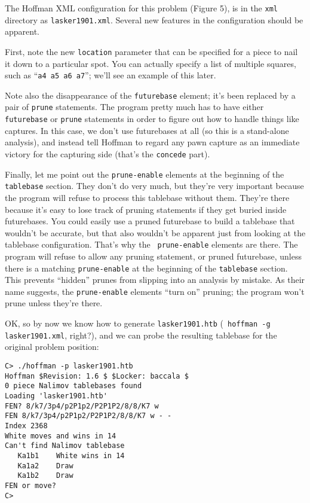 \documentclass[11pt]{article}
\begin{document}
The Hoffman XML configuration for this problem (Figure 5), is in the
{\tt xml} directory as {\tt lasker1901.xml}.  Several new
features in the configuration should be apparent.

First, note the new {\tt location} parameter that can be specified for
a piece to nail it down to a particular spot.  You can actually
specify a list of multiple squares, such as ``{\tt a4 a5 a6 a7}'';
we'll see an example of this later.

Note also the disappearance of the {\tt futurebase} element; it's been
replaced by a pair of {\tt prune} statements.  The program pretty much
has to have either {\tt futurebase} or {\tt prune} statements in order
to figure out how to handle things like captures.  In this case, we
don't use futurebases at all (so this is a stand-alone analysis), and
instead tell Hoffman to regard any pawn capture as an immediate
victory for the capturing side (that's the {\tt concede} part).

Finally, let me point out the {\tt prune-enable} elements at the
beginning of the {\tt tablebase} section.  They don't do very much,
but they're very important because the program will refuse to process
this tablebase without them.  They're there because it's easy to lose
track of pruning statements if they get buried inside futurebases.
You could easily use a pruned futurebase to build a tablebase that
wouldn't be accurate, but that also wouldn't be apparent just from
looking at the tablebase configuration.  That's why the {\tt
prune-enable} elements are there.  The program will refuse to allow
any pruning statement, or pruned futurebase, unless there is a
matching {\tt prune-enable} at the beginning of the {\tt tablebase}
section.  This prevents ``hidden'' prunes from slipping into an
analysis by mistake.  As their name suggests, the {\tt prune-enable}
elements ``turn on'' pruning; the program won't prune unless they're there.

OK, so by now we know how to generate {\tt lasker1901.htb} ({\tt
hoffman -g lasker1901.xml}, right?), and we can probe the resulting
tablebase for the original problem position:

\begin{verbatim}
C> ./hoffman -p lasker1901.htb
Hoffman $Revision: 1.6 $ $Locker: baccala $
0 piece Nalimov tablebases found
Loading 'lasker1901.htb'
FEN? 8/k7/3p4/p2P1p2/P2P1P2/8/8/K7 w
FEN 8/k7/3p4/p2P1p2/P2P1P2/8/8/K7 w - -
Index 2368
White moves and wins in 14
Can't find Nalimov tablebase
   Ka1b1    White wins in 14
   Ka1a2    Draw
   Ka1b2    Draw
FEN or move?
C>
\end{verbatim}
\end{document}
